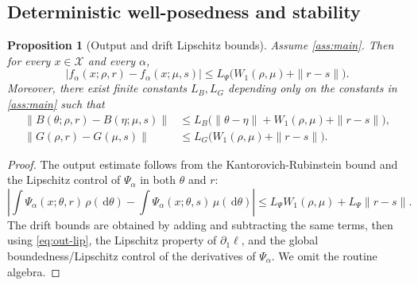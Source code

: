 \documentclass[11pt]{article}
\newtheorem{proposition}[theorem]{Proposition}
\theoremstyle{definition}
\newcommand{\W}{W_1}
\newcommand{\dd}{\,\mathrm{d}}
\begin{document}
\subsection{Deterministic well-posedness and stability}

\begin{proposition}[Output and drift Lipschitz bounds]
\label{prop:lipschitz}
Assume \cref{ass:main}. Then for every $x\in\mathcal X$ and every $\alpha$,
\begin{equation}
  |f_\alpha(x;\rho,r)-f_\alpha(x;\mu,s)|
  \le
  L_\Psi\bigl(\W(\rho,\mu)+\|r-s\|\bigr).
  \label{eq:out-lip}
\end{equation}
Moreover, there exist finite constants $L_B,L_G$ depending only on the constants in \cref{ass:main} such that
\begin{align}
  \|B(\theta;\rho,r)-B(\eta;\mu,s)\|
  &\le
  L_B\bigl(
    \|\theta-\eta\|+\W(\rho,\mu)+\|r-s\|
  \bigr),
  \label{eq:B-lip}
  \\
  \|G(\rho,r)-G(\mu,s)\|
  &\le
  L_G\bigl(
    \W(\rho,\mu)+\|r-s\|
  \bigr).
  \label{eq:G-lip}
\end{align}
\end{proposition}

\begin{proof}
The output estimate follows from the Kantorovich-Rubinstein bound and the Lipschitz control of $\Psi_\alpha$ in both $\theta$ and $r$:
\[
  \left|
    \int \Psi_\alpha(x;\theta,r)\,\rho(\dd\theta)
    -
    \int \Psi_\alpha(x;\theta,s)\,\mu(\dd\theta)
  \right|
  \le
  L_\Psi\W(\rho,\mu)+L_\Psi\|r-s\|.
\]
The drift bounds are obtained by adding and subtracting the same terms, then using \eqref{eq:out-lip}, the Lipschitz property of $\partial_1\ell$, and the global boundedness/Lipschitz control of the derivatives of $\Psi_\alpha$. We omit the routine algebra.
\end{proof}
\end{document}
